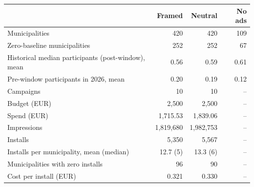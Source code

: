 \begin{tabular}{lrrr}
\toprule
  & Framed & Neutral & No ads \\
\midrule
Municipalities & 420 & 420 & 109 \\
Zero-baseline municipalities & 252 & 252 & 67 \\
Historical median participants (post-window), mean & 0.56 & 0.59 & 0.61 \\
Pre-window participants in 2026, mean & 0.20 & 0.19 & 0.12 \\
Campaigns & 10 & 10 & -- \\
Budget (EUR) & 2,500 & 2,500 & -- \\
Spend (EUR) & 1,715.53 & 1,839.06 & -- \\
Impressions & 1,819,680 & 1,982,753 & -- \\
Installs & 5,350 & 5,567 & -- \\
Installs per municipality, mean (median) & 12.7 (5) & 13.3 (6) & -- \\
Municipalities with zero installs & 96 & 90 & -- \\
Cost per install (EUR) & 0.321 & 0.330 & -- \\
\bottomrule
\end{tabular}
